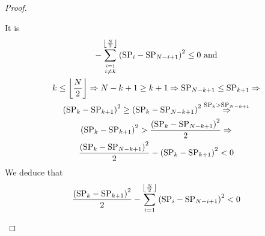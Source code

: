 \begin{proof}
\begin{itemize}
    It is
    \begin{gather*}
      - \sum\limits_{\overset{i = 1}{i \neq k}}^{\floor*{\frac{\playerlen}{2}}}
      \left(\stpow_i - \stpow_{\playerlen - i + 1}\right)^2 \leq 0 \text{ and}
      \\
      k \leq \floor*{\frac{\playerlen}{2}} \Rightarrow \playerlen - k + 1 \geq k
      + 1 \Rightarrow \stpow_{\playerlen - k + 1} \leq \stpow_{k + 1}
      \Rightarrow \\
      \left(\stpow_k - \stpow_{k + 1}\right)^2 \geq \left(\stpow_k -
      \stpow_{\playerlen - k + 1}\right)^2 \overset{\stpow_k >
      \stpow_{\playerlen - k + 1}}{\Rightarrow} \\
      \left(\stpow_k - \stpow_{k + 1}\right)^2 > \frac{\left(\stpow_k -
      \stpow_{\playerlen - k + 1}\right)^2}{2} \Rightarrow \\
      \frac{\left(\stpow_k - \stpow_{\playerlen - k + 1}\right)^2}{2} -
      \left(\stpow_k - \stpow_{k + 1}\right)^2 < 0
    \end{gather*}
    We deduce that
    \begin{equation*}
      \frac{\left(\stpow_k - \stpow_{k+1}\right)^2}{2} - \sum\limits_{i =
      1}^{\floor*{\frac{\playerlen}{2}}} \left(\stpow_i - \stpow_{\playerlen - i
      + 1}\right)^2 < 0
    \end{equation*}


\end{itemize}
\end{proof}
